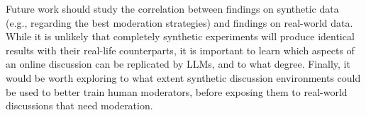 %

Future work should study the correlation between findings on synthetic data (e.g., regarding the best moderation strategies) and findings on real-world data. While it is unlikely that completely synthetic experiments will produce identical results with their real-life counterparts, it is important to learn which aspects of an online discussion can be replicated by \acp{LLM}, and to what degree. Finally, it would be worth exploring to what extent synthetic discussion environments could be used to better train human moderators, before exposing them to real-world discussions that need moderation.